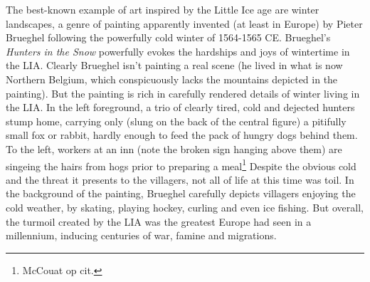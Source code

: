 \documentclass[amstex,12pt]{book}
\begin{document}
The best-known example of art inspired by the Little Ice age are winter landscapes, a genre of painting apparently invented (at least in Europe) by Pieter Brueghel following the powerfully cold winter of 1564-1565 CE. Brueghel's \textit{Hunters in the Snow} powerfully evokes the hardships and joys of wintertime in the LIA. Clearly Brueghel isn't painting a real scene (he lived in what is now Northern Belgium, which conspicuously lacks the mountains depicted in the painting). But the painting is rich in carefully rendered details of winter living in the LIA. In the left foreground, a trio of clearly tired, cold and dejected hunters stump home, carrying only (slung on the back of the central figure) a pitifully small fox or rabbit, hardly enough to feed the pack of hungry dogs behind them. To the left, workers at an inn (note the broken sign hanging above them) are singeing the hairs from hogs prior to preparing a meal\footnote{McCouat op cit.} Despite the obvious cold and the threat it presents to the villagers, not all of life at this time was toil. In the background of the painting, Brueghel carefully depicts villagers enjoying the cold weather, by skating, playing hockey, curling and even ice fishing. But overall, the turmoil created by the LIA was the greatest Europe had seen in a millennium, inducing centuries of war, famine and migrations.\\
\end{document}
